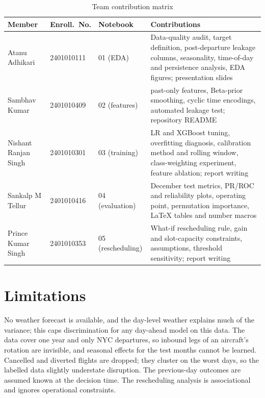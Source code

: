 \documentclass[conference]{IEEEtran}
\begin{document}
\begin{table}[t]
\caption{Team contribution matrix}
\label{tab:contrib}
\centering
\small
\begin{tabular}{>{\raggedright\arraybackslash}p{}p{}p{}>{\raggedright\arraybackslash}p{}}
\toprule
Member & Enroll.\ No. & Notebook & Contributions \\
\midrule
Atanu Adhikari & 2401010111 & 01 (EDA) & Data-quality audit, target definition, post-departure leakage columns, seasonality, time-of-day and persistence analysis, EDA figures; presentation slides \\
Sambhav Kumar & 2401010409 & 02 (features) & 35 past-only features, Beta-prior smoothing, cyclic time encodings, automated leakage test; repository README \\
Nishant Ranjan Singh & 2401010301 & 03 (training) & LR and XGBoost tuning, overfitting diagnosis, calibration method and rolling window, class-weighting experiment, feature ablation; report writing \\
Sankalp M Tellur & 2401010416 & 04 (evaluation) & December test metrics, PR/ROC and reliability plots, operating point, permutation importance, LaTeX tables and number macros \\
Prince Kumar Singh & 2401010353 & 05 (rescheduling) & What-if rescheduling rule, gain and slot-capacity constraints, assumptions, threshold sensitivity; report writing \\
\bottomrule
\end{tabular}
\end{table}

\section{Limitations}
No weather forecast is available, and the day-level weather explains much of the
variance; this caps discrimination for any day-ahead model on this data. The data
cover one year and only NYC departures, so inbound legs of an aircraft's rotation are
invisible, and seasonal effects for the test months cannot be learned. Cancelled and
diverted flights are dropped; they cluster on the worst days, so the labelled data
slightly understate disruption. The previous-day outcomes are assumed known at the
decision time. The rescheduling analysis is associational and ignores operational
constraints.

\end{document}
